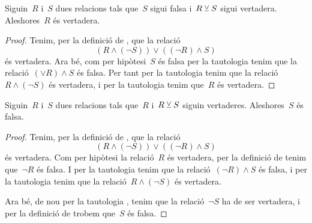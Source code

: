 \documentclass[../fonaments-de-les-matematiques.tex]{subfiles}
\begin{document}
    \begin{tautology}
        \label{taut:disjuncio-excloent-1}
        Siguin~\(R\) i~\(S\) dues relacions tals que~\(S\) sigui falsa i~\(R\mathbin{\veebar} S\) sigui vertadera.
        Aleshores~\(R\) és vertadera.
    \end{tautology}
    \begin{proof}
        Tenim, per la definició de , que la relació
        \[
            (R\land(\lnot S))\lor((\lnot R)\land S)
        \]
        és vertadera.
        Ara bé, com per hipòtesi~\(S\) és falsa per la tautologia  tenim que la relació~\((\lor R)\land S\) és falsa.
        Per tant per la tautologia  tenim que la relació~\(R\land(\lnot S)\) és vertadera, i per la tautologia  tenim que~\(R\) és vertadera.
    \end{proof}
    \begin{tautology}
        \label{taut:disjuncio-excloent-2}
        Siguin~\(R\) i~\(S\) dues relacions tals que~\(R\) i~\(R\mathbin{\veebar} S\) siguin vertaderes.
        Aleshores~\(S\) és falsa.
    \end{tautology}
    \begin{proof}
        Tenim, per la definició de , que la relació
        \[
            (R\land(\lnot S))\lor((\lnot R)\land S)
        \]
        és vertadera.
        Com per hipòtesi la relació~\(R\) és vertadera, per la definició de  tenim que~\(\lnot R\) és falsa.
        I per la tautologia  tenim que la relació~\((\lnot R)\land S\) és falsa, i per la tautologia  tenim que la relació~\(R\land(\lnot S)\) és vertadera.

        Ara bé, de nou per la tautologia , tenim que la relació~\(\lnot S\) ha de ser vertadera, i per la definició de  trobem que~\(S\) és falsa.
    \end{proof}
\end{document}
